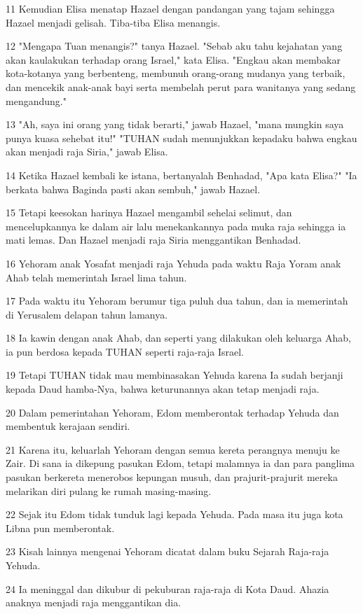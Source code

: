 \par 11 Kemudian Elisa menatap Hazael dengan pandangan yang tajam sehingga Hazael menjadi gelisah. Tiba-tiba Elisa menangis.
\par 12 "Mengapa Tuan menangis?" tanya Hazael. "Sebab aku tahu kejahatan yang akan kaulakukan terhadap orang Israel," kata Elisa. "Engkau akan membakar kota-kotanya yang berbenteng, membunuh orang-orang mudanya yang terbaik, dan mencekik anak-anak bayi serta membelah perut para wanitanya yang sedang mengandung."
\par 13 "Ah, saya ini orang yang tidak berarti," jawab Hazael, "mana mungkin saya punya kuasa sehebat itu!" "TUHAN sudah menunjukkan kepadaku bahwa engkau akan menjadi raja Siria," jawab Elisa.
\par 14 Ketika Hazael kembali ke istana, bertanyalah Benhadad, "Apa kata Elisa?" "Ia berkata bahwa Baginda pasti akan sembuh," jawab Hazael.
\par 15 Tetapi keesokan harinya Hazael mengambil sehelai selimut, dan mencelupkannya ke dalam air lalu menekankannya pada muka raja sehingga ia mati lemas. Dan Hazael menjadi raja Siria menggantikan Benhadad.
\par 16 Yehoram anak Yosafat menjadi raja Yehuda pada waktu Raja Yoram anak Ahab telah memerintah Israel lima tahun.
\par 17 Pada waktu itu Yehoram berumur tiga puluh dua tahun, dan ia memerintah di Yerusalem delapan tahun lamanya.
\par 18 Ia kawin dengan anak Ahab, dan seperti yang dilakukan oleh keluarga Ahab, ia pun berdosa kepada TUHAN seperti raja-raja Israel.
\par 19 Tetapi TUHAN tidak mau membinasakan Yehuda karena Ia sudah berjanji kepada Daud hamba-Nya, bahwa keturunannya akan tetap menjadi raja.
\par 20 Dalam pemerintahan Yehoram, Edom memberontak terhadap Yehuda dan membentuk kerajaan sendiri.
\par 21 Karena itu, keluarlah Yehoram dengan semua kereta perangnya menuju ke Zair. Di sana ia dikepung pasukan Edom, tetapi malamnya ia dan para panglima pasukan berkereta menerobos kepungan musuh, dan prajurit-prajurit mereka melarikan diri pulang ke rumah masing-masing.
\par 22 Sejak itu Edom tidak tunduk lagi kepada Yehuda. Pada masa itu juga kota Libna pun memberontak.
\par 23 Kisah lainnya mengenai Yehoram dicatat dalam buku Sejarah Raja-raja Yehuda.
\par 24 Ia meninggal dan dikubur di pekuburan raja-raja di Kota Daud. Ahazia anaknya menjadi raja menggantikan dia.
